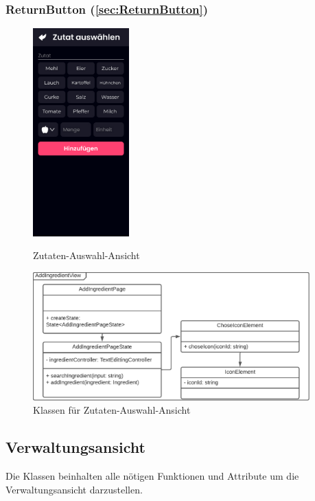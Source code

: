 \documentclass{entwurfsheft}
\begin{document}
\subsubsection*{ReturnButton (\ref{sec:ReturnButton})}


\begin{figure}[htp]
    \begin{minipage}
        [t]{0.49\textwidth}
        \centering
        \includegraphics[height=80mm]{images/Presentation-layer/IngredientPickerView.jpg}
        \caption{Zutaten-Auswahl-Ansicht}
    \end{minipage}
    \begin{minipage}
        [t]{0.49\textwidth}
        \centering
        \includegraphics[width=0.95\textwidth]{images/Presentation-layer/IngredientPickerViewClass.pdf}
        \caption{Klassen für Zutaten-Auswahl-Ansicht}
    \end{minipage}
\end{figure}

\newpage

\subsection{Verwaltungsansicht}
Die Klassen beinhalten alle nötigen Funktionen und Attribute um die Verwaltungsansicht darzustellen.
\end{document}
